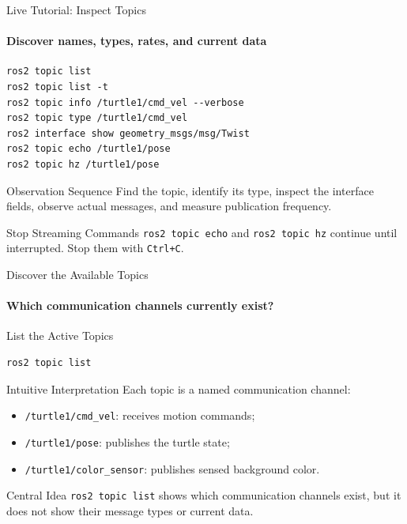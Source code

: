 \begin{frame}[fragile]{Live Tutorial: Inspect Topics}
\framesubtitle{Discover names, types, rates, and current data}
\scriptsize
\begin{verbatim}
ros2 topic list
ros2 topic list -t
ros2 topic info /turtle1/cmd_vel --verbose
ros2 topic type /turtle1/cmd_vel
ros2 interface show geometry_msgs/msg/Twist
ros2 topic echo /turtle1/pose
ros2 topic hz /turtle1/pose
\end{verbatim}
\begin{block}{Observation Sequence}
Find the topic, identify its type, inspect the interface fields, observe actual messages, and measure publication frequency.
\end{block}
\begin{alertblock}{Stop Streaming Commands}
\texttt{ros2 topic echo} and \texttt{ros2 topic hz} continue until interrupted. Stop them with \texttt{Ctrl+C}.
\end{alertblock}
\end{frame}


\begin{frame}[fragile]{Discover the Available Topics}
\framesubtitle{Which communication channels currently exist?}

\footnotesize

\begin{block}{List the Active Topics}
\begin{verbatim}
ros2 topic list
\end{verbatim}
\end{block}


\begin{block}{Intuitive Interpretation}
Each topic is a named communication channel:

\begin{itemize}
    \setlength{\itemsep}{0.16em}
    \item \texttt{/turtle1/cmd\_vel}: receives motion commands;
    \item \texttt{/turtle1/pose}: publishes the turtle state;
    \item \texttt{/turtle1/color\_sensor}: publishes sensed background color.
\end{itemize}
\end{block}

\begin{alertblock}{Central Idea}
\texttt{ros2 topic list} shows which communication channels exist,
but it does not show their message types or current data.
\end{alertblock}

\end{frame}

